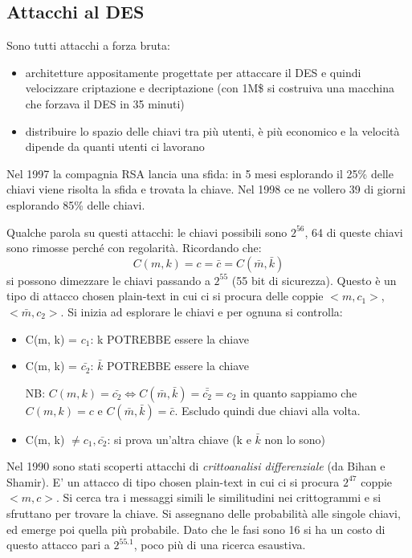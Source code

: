 \subsection{Attacchi al DES}
Sono tutti attacchi a forza bruta:
\begin{itemize}
    \item architetture appositamente progettate per attaccare il DES e quindi velocizzare criptazione e decriptazione (con 1M\$ si costruiva una macchina che forzava il DES in 35 minuti)
    \item distribuire lo spazio delle chiavi tra più utenti, è più economico e la velocità dipende da quanti utenti ci lavorano
\end{itemize}

Nel 1997 la compagnia RSA lancia una sfida: in 5 mesi esplorando il 25\% delle chiavi viene risolta la sfida e trovata la chiave.
Nel 1998 ce ne vollero 39 di giorni esplorando 85\% delle chiavi.

Qualche parola su questi attacchi: le chiavi possibili sono $2^{56}$, 64 di queste chiavi sono rimosse perché con regolarità. Ricordando che:
$$ C(m, k) = c = \bar{c} = C(\bar{m}, \bar{k}) $$
si possono dimezzare le chiavi passando a $2^{55}$ (55 bit di sicurezza). Questo è un tipo di attacco chosen plain-text in cui ci si procura delle coppie $<m, c_1>$, $<\bar{m}, c_2>$. Si inizia ad esplorare le chiavi e per ognuna si controlla:
\begin{itemize}
    \item C(m, k) = $c_1$: k POTREBBE essere la chiave
    \item C(m, k) = $\bar{c_2}$: $\bar{k}$ POTREBBE essere la chiave
    
    NB: $C(m,k) = \bar{c_2} \iff C(\bar{m},\bar{k}) = \bar{\bar{c_2}} = c_2$ in quanto sappiamo che $C(m, k) = c$ e $C(\bar{m}, \bar{k})=\bar{c}$. Escludo quindi due chiavi alla volta.
    \item C(m, k) $\neq c_1, \bar{c_2}$: si prova un'altra chiave (k e $\bar{k}$ non lo sono)
\end{itemize}

Nel 1990 sono stati scoperti attacchi di \emph{crittoanalisi differenziale} (da Bihan e Shamir). E' un attacco di tipo chosen plain-text in cui ci si procura $2^{47}$ coppie $<m,c>$.
Si cerca tra i messaggi simili le similitudini nei crittogrammi e si sfruttano per trovare la chiave.
Si assegnano delle probabilità alle singole chiavi, ed emerge poi quella più probabile.
Dato che le fasi sono 16 si ha un costo di questo attacco pari a $2^{55.1}$, poco più di una ricerca esaustiva.

